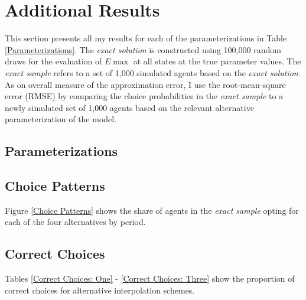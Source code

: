 \section{Additional Results}\label{Results}
This section presents all my results for each of the parameterizations in Table \ref{Parameterizations}. The \textit{exact solution} is constructed using 100,000 random draws for the evaluation of $E\max$ at all states at the true parameter values. The \textit{exact sample} refers to a set of 1,000 simulated agents based on the \textit{exact solution}. As on overall measure of the approximation error, I use the root-mean-square error (RMSE) by comparing the choice probabilities in the \textit{exact sample} to a newly simulated set of 1,000 agents based on the relevant alternative parameterization of the model.
\subsection{Parameterizations}
 
\subsection{Choice Patterns}
Figure \ref{Choice Patterns} shows the share of agents in the \textit{exact sample} opting for each of the four alternatives by period.\\\newline
\clearpage
\subsection{Correct Choices}
Tables \ref{Correct Choices: One} - \ref{Correct Choices: Three} show the proportion of correct choices for alternative interpolation schemes.



